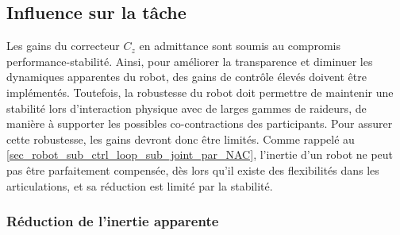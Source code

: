 \documentclass[12pt, a4paper]{article} %
\numberwithin{equation}{section}
\begin{document}
\newlineBlank

\subsection{Influence sur la tâche} \label{sec_robot_sub_task_influence}

Les gains du correcteur $ C_z $ en admittance sont soumis au compromis performance-stabilité. Ainsi, pour améliorer la transparence et diminuer les dynamiques apparentes du robot, des gains de contrôle élevés doivent être implémentés. Toutefois, la robustesse du robot doit permettre de maintenir une stabilité lors d'interaction physique avec de larges gammes de raideurs, de manière à supporter les possibles co-contractions des participants. Pour assurer cette robustesse, les gains devront donc être limités. Comme rappelé au \cref{sec_robot_sub_ctrl_loop_sub_joint_par_NAC}, l'inertie d'un robot ne peut pas être parfaitement compensée, dès lors qu'il existe des flexibilités dans les articulations, et sa réduction est limité par la stabilité.

\subsubsection{Réduction de l'inertie apparente} \label{sec_robot_sub_task_influence_sub_inertia_red}
\end{document}

